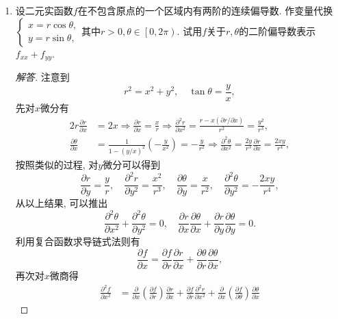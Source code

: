 \begin{3a}
\begin{enumerate}
\begin{proof}[解答]
容易算得\[f_x(x,y,z)=\frac{-x}{\left(x^2+y^2+z^2\right)^{3/2}},\quad f_{xx}(x,y,z)=\frac{2x^2-y^2-z^2}{\left(x^2+y^2+z^2\right)^{5/2}},\]
结合\(x,y,z\)的对称性可得\[f_{xx}(x,y,z)+f_{yy}(x,y,z)+f_{zz}(x,y,z)=0.\qedhere\]
\end{proof}
注：更一般地，$r^{2-n}$是$\R^n\setminus\{\boldsymbol{0}\}$上的调和函数，
其中$r=\sqrt{x_1^2+\cdots+x_n^2}$；本题即是$n=3$的特例。
\item 设二元实函数\(f\)在不包含原点的一个区域内有两阶的连续偏导数. 
作变量代换\(\begin{cases}
    x=r\cos\theta,\\y=r\sin\theta,
\end{cases}\)其中\(r>0,\theta\in\left[0,2\pi\right)\). 
试用\(f\)关于\(r,\theta\)的二阶偏导数表示\(f_{xx}+f_{yy}\).
\begin{proof}[解答]
注意到\[r^2=x^2+y^2,\quad \tan\theta=\frac{y}{x},\]先对\(x\)微分有
\[\begin{aligned}
2r\frac{\partial r}{\partial x}&=2x\Rightarrow\frac{\partial r}{\partial x}=\frac{x}{r}\Rightarrow\frac{\partial^2r}{\partial x^2}=\frac{r-x(\partial r/\partial x)}{r^2}=\frac{y^2}{r^3},\\
\frac{\partial\theta}{\partial x}&=\frac{1}{1-(y/x)^2}\left(-\frac{y}{x^2}\right)=-\frac{y}{r^2}\Rightarrow\frac{\partial^2\theta}{\partial x^2}=\frac{2y}{r^3}\frac{\partial r}{\partial x}=\frac{2xy}{r^4},
\end{aligned}\]
按照类似的过程, 对\(y\)微分可以得到
\[\frac{\partial r}{\partial y}=\frac{y}{r},\quad\frac{\partial^2r}{\partial y^2}=\frac{x^2}{r^3},\quad\frac{\partial\theta}{\partial y}=\frac{x}{r^2},\quad\frac{\partial^2\theta}{\partial y^2}=-\frac{2xy}{r^4},\]
从以上结果, 可以推出
\[\frac{\partial^2\theta}{\partial x^2}+\frac{\partial^2\theta}{\partial y^2}=0,\quad\frac{\partial r}{\partial x}\frac{\partial \theta}{\partial x}+\frac{\partial r}{\partial y}\frac{\partial \theta}{\partial y}=0.\]
利用复合函数求导链式法则有
\[\frac{\partial f}{\partial x}=\frac{\partial f}{\partial r}\frac{\partial r}{\partial x}+\frac{\partial \theta}{\partial r}\frac{\partial \theta}{\partial x},\]
再次对\(x\)微商得\[\begin{aligned}
\frac{\partial^2f}{\partial x^2}&=\frac{\partial}{\partial x}\left(\frac{\partial f}{\partial r}\right)\frac{\partial r}{\partial x}
+\frac{\partial f}{\partial r}\frac{\partial^2r}{\partial x^2}
+\frac{\partial}{\partial x}\left(\frac{\partial f}{\partial \theta}\right)\frac{\partial \theta}{\partial x}

\end{aligned}\]
\end{proof}
\end{enumerate}
\end{3a}
